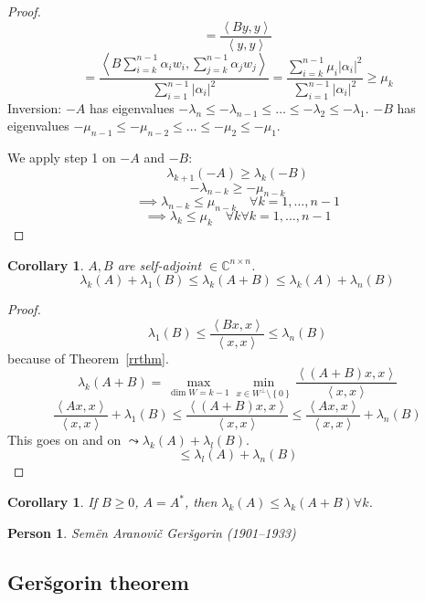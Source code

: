 \documentclass{article}
\newcounter{lecref}[section]
\numberwithin{lecref}{section}
\newtheorem{corollary}[lecref]{Corollary}
\newtheorem*{person}{Person}
\newcommand{\set}[1]{\left\{#1\right\}}
\newcommand{\angel}[1]{\left\langle#1\right\rangle}
\newcommand{\card}[1]{\left|#1\right|}
\begin{document}
\begin{proof}
\[    = \frac{\angel{By, y}}{\angel{y, y}}
  \] \[
    = \frac{\angel{B \sum_{i=k}^{n-1} \alpha_i w_i, \sum_{j=k}^{n-1} \alpha_j w_j}}{\sum_{i=1}^{n-1} \card{\alpha_i}^2}
    = \frac{\sum_{i=k}^{n-1} \mu_i \card{\alpha_i}^2}{\sum_{i=1}^{n-1} \card{\alpha_i}^2} \geq \mu_k
  \]
  Inversion:
  $-A$ has eigenvalues $-\lambda_n \leq -\lambda_{n-1} \leq \dots \leq -\lambda_2 \leq -\lambda_1$.
  $-B$ has eigenvalues $-\mu_{n-1} \leq -\mu_{n-2} \leq \dots \leq -\mu_2 \leq -\mu_1$.

  We apply step 1 on $-A$ and $-B$:
  \[ \lambda_{k+1} (-A) \geq \lambda_k (-B) \]
  \[ -\lambda_{n-k} \geq -\mu_{n-k} \]
  \[ \implies \lambda_{n-k} \leq \mu_{n-k} \quad \forall k = 1, \dots, n-1 \]
  \[ \implies \lambda_k \leq \mu_k \quad \forall k \forall k = 1, \dots, n-1 \]
\end{proof}

\begin{corollary} %
  \label{col138}
  $A, B$ are self-adjoint $\in \mathbb C^{n \times n}$.
  \[ \lambda_{k}(A) + \lambda_1(B) \leq \lambda_k(A + B) \leq \lambda_k(A) + \lambda_n(B) \]
\end{corollary}
\begin{proof}
  \[ \lambda_1(B) \leq \frac{\angel{Bx, x}}{\angel{x, x}} \leq \lambda_n(B) \]
  because of Theorem~\ref{rrthm}.
  \[ \lambda_k(A + B) = \max_{\dim{W}=k-1} \min_{x \in W^\bot \setminus \set{0}} \frac{\angel{(A + B)x, x}}{\angel{x, x}} \]
  \[ \frac{\angel{Ax, x}}{\angel{x, x}} + \lambda_1(B) \leq \frac{\angel{(A + B)x, x}}{\angel{x, x}} \leq \frac{\angel{Ax, x}}{\angel{x, x}} + \lambda_n(B) \]
  This goes on and on $\leadsto \lambda_k(A) + \lambda_l(B)$.
  \[ \leq \lambda_l(A) + \lambda_n(B) \]
\end{proof}

\begin{corollary} %
  If $B \geq 0$, $A = A^*$, then $\lambda_k(A) \leq \lambda_k(A + B) \forall k$.
\end{corollary}

\begin{person}
  Sem\"en Aranovi\v{c} Ger\v{s}gorin (1901--1933)
\end{person}

\subsection{Ger\v{s}gorin theorem}
\end{document}
